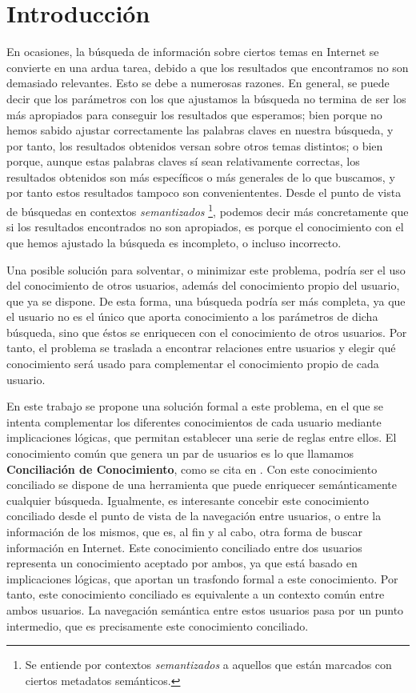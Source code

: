 \chapter*{Introducción}
\label{intro:intro}

En ocasiones, la búsqueda de información sobre ciertos temas en Internet se convierte en una ardua tarea, debido a que los resultados que encontramos no son demasiado relevantes. Esto se debe a numerosas razones. En general, se puede decir que los parámetros con los que ajustamos la búsqueda no termina de ser los más apropiados para conseguir los resultados que esperamos; bien porque no hemos sabido ajustar correctamente las palabras claves en nuestra búsqueda, y por tanto, los resultados obtenidos versan sobre otros temas distintos; o bien porque, aunque estas palabras claves sí sean relativamente correctas, los resultados obtenidos son más específicos o más generales de lo que buscamos, y por tanto estos resultados tampoco son conveniententes. Desde el punto de vista de búsquedas en contextos \emph{semantizados} \footnote{Se entiende por contextos \emph{semantizados} a aquellos que están marcados con ciertos metadatos semánticos.}, podemos decir más concretamente que si los resultados encontrados no son apropiados, es porque el conocimiento con el que hemos ajustado la búsqueda es incompleto, o incluso incorrecto.

Una posible solución para solventar, o minimizar este problema, podría ser el uso del conocimiento de otros usuarios, además del conocimiento propio del usuario, que ya se dispone. De esta forma, una búsqueda podría ser más completa, ya que el usuario no es el único que aporta conocimiento a los parámetros de dicha búsqueda, sino que éstos se enriquecen con el conocimiento de otros usuarios. Por tanto, el problema se traslada a encontrar relaciones entre usuarios y elegir qué conocimiento será usado para complementar el conocimiento propio de cada usuario.

En este trabajo se propone una solución formal a este problema, en el que se intenta complementar los diferentes conocimientos de cada usuario mediante implicaciones lógicas, que permitan establecer una serie de reglas entre ellos. El conocimiento común que genera un par de usuarios es lo que llamamos {\bf Conciliación de Conocimiento}, como se cita en \cite{algoritmo}. Con este conocimiento conciliado se dispone de una herramienta que puede enriquecer semánticamente cualquier búsqueda. Igualmente, es interesante concebir este conocimiento conciliado desde el punto de vista de la navegación entre usuarios, o entre la información de los mismos, que es, al fin y al cabo, otra forma de buscar información en Internet. Este conocimiento conciliado entre dos usuarios representa un conocimiento aceptado por ambos, ya que está basado en implicaciones lógicas, que aportan un trasfondo formal a este conocimiento. Por tanto, este conocimiento conciliado es equivalente a un contexto común entre ambos usuarios. La navegación semántica entre estos usuarios pasa por un punto intermedio, que es precisamente este conocimiento conciliado.

